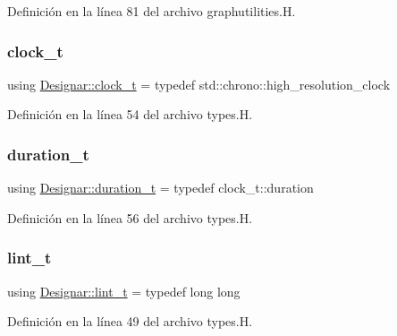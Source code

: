 Definición en la línea 81 del archivo graphutilities.\+H.

\mbox{\label{namespace_designar_a4892484bd553fb9ec4b8a559a83a415c}} 
\subsubsection{\texorpdfstring{clock\+\_\+t}{clock\_t}}
{\footnotesize\ttfamily using \hyperlink{namespace_designar_a4892484bd553fb9ec4b8a559a83a415c}{Designar\+::clock\+\_\+t} = typedef std\+::chrono\+::high\+\_\+resolution\+\_\+clock}



Definición en la línea 54 del archivo types.\+H.

\mbox{\label{namespace_designar_a585b685c3d4f0d52edf0a6412caee626}} 
\subsubsection{\texorpdfstring{duration\+\_\+t}{duration\_t}}
{\footnotesize\ttfamily using \hyperlink{namespace_designar_a585b685c3d4f0d52edf0a6412caee626}{Designar\+::duration\+\_\+t} = typedef clock\+\_\+t\+::duration}



Definición en la línea 56 del archivo types.\+H.

\mbox{\label{namespace_designar_a9d113d66a39e82b73727c72cd3a52f73}} 
\subsubsection{\texorpdfstring{lint\+\_\+t}{lint\_t}}
{\footnotesize\ttfamily using \hyperlink{namespace_designar_a9d113d66a39e82b73727c72cd3a52f73}{Designar\+::lint\+\_\+t} = typedef long long}



Definición en la línea 49 del archivo types.\+H.

\mbox{\label{namespace_designar_abc6ea5602461a15100a645d1f0e5cbcb}} 
